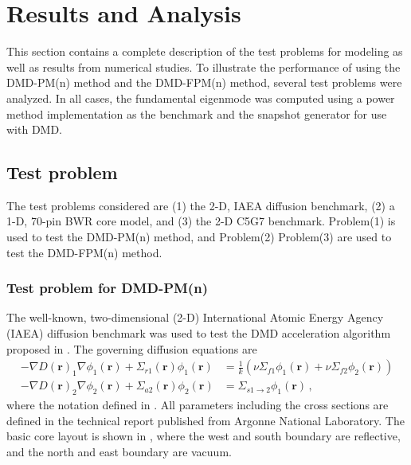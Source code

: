 \cleardoublepage

\chapter{Results and Analysis}
\label{chapter:results}
This section contains a complete description of the test problems for modeling as well as results from numerical studies.
To illustrate the performance of using the DMD-PM(n) method and the DMD-FPM(n) method, several test problems were analyzed. 
In all cases, the fundamental eigenmode was computed using a power method implementation as the benchmark and the snapshot generator for use with DMD. 

\section{Test problem}
The test problems considered are (1) the 2-D, IAEA diffusion benchmark\cite{center1977benchmark}, (2) a 1-D, 70-pin BWR core model\citep{rahnema_generalized_2008}, and (3) the 2-D C5G7 benchmark\cite{oecd_nuclear_energy_agency_benchmark_2003}.
Problem(1) is used to test the DMD-PM(n) method, and Problem(2) Problem(3) are used to test the DMD-FPM(n) method.
\subsection{Test problem for DMD-PM(n)}
The well-known, two-dimensional (2-D) International Atomic Energy Agency (IAEA) diffusion benchmark was used to test the DMD acceleration algorithm proposed in .
The governing diffusion equations are
\begin{equation}
 \begin{split}
  -\nabla D(\mathbf{r})_1 \nabla \phi_1 (\mathbf{r}) + \Sigma_{r1}(\mathbf{r}) \phi_1 (\mathbf{r}) 
    &= \frac{1}{k} \left (\nu\Sigma_{f1}\phi_1(\mathbf{r}) + \nu\Sigma_{f2}\phi_2(\mathbf{r}) \right ) \\
 -\nabla D(\mathbf{r})_2 \nabla \phi_2 (\mathbf{r}) + \Sigma_{a2}(\mathbf{r}) \phi_2 (\mathbf{r}) 
    &= \Sigma_{s1\to 2}\phi_1(\mathbf{r}) \, ,
 \end{split}
 \label{eq:twogroupdiff}
\end{equation}
where the notation defined in .
All parameters including the cross sections are defined in the technical report published from Argonne National Laboratory.
The basic core layout is shown in , where the west and south boundary are reflective, and the north and east boundary are vacuum.

